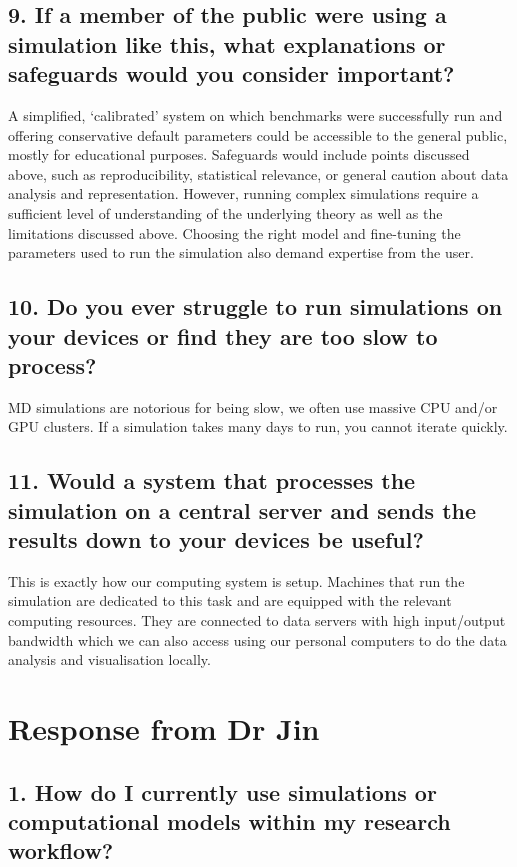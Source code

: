 \subsection*{9. If a member of the public were using a simulation like this, what explanations or safeguards would you consider important?}
A simplified, ‘calibrated’ system on which benchmarks were successfully run and offering conservative default parameters could be accessible to the general public, mostly for educational purposes. Safeguards would include points discussed above, such as reproducibility, statistical relevance, or general caution about data analysis and representation. However, running complex simulations require a sufficient level of understanding of the underlying theory as well as the limitations discussed above. Choosing the right model and fine-tuning the parameters used to run the simulation also demand expertise from the user.

\subsection*{10. Do you ever struggle to run simulations on your devices or find they are too slow to process?}
MD simulations are notorious for being slow, we often use massive CPU and/or GPU clusters. If a simulation takes many days to run, you cannot iterate quickly.

\subsection*{11. Would a system that processes the simulation on a central server and sends the results down to your devices be useful?}
This is exactly how our computing system is setup. Machines that run the simulation are dedicated to this task and are equipped with the relevant computing resources. They are connected to data servers with high input/output bandwidth which we can also access using our personal computers to do the data analysis and visualisation locally.

\section{Response from Dr Jin}
\label{sec:responseDrJin}
\subsection*{1. How do I currently use simulations or computational models within my research workflow?}

